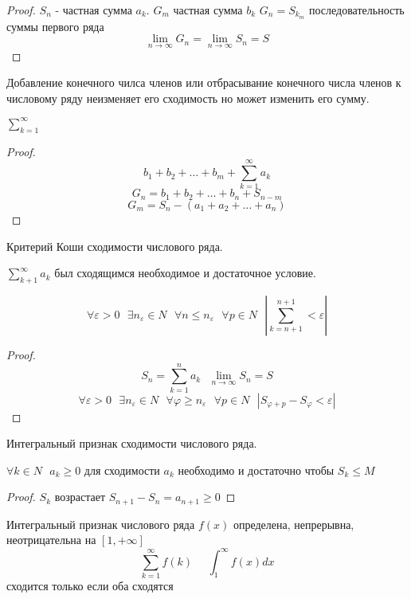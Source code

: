 \begin{proof}
  $S_n$ - частная сумма $a_k$. $G_m$ частная сумма $b_k$ $G_n = S_{k_m}$
  последовательность суммы первого ряда
  $$
  \lim_{n \to \infty} G_n = \lim_{n \to \infty} S_n = S
  $$
\end{proof}

  Добавление конечного чилса членов или отбрасывание конечного числа членов к
числовому ряду неизменяет его сходимость но может изменить его сумму.

\begin{theorem}
  $\sum_{k=1}^{\infty}$
\end{theorem}

\begin{proof}
  $$
  b_1 + b_2 + \ldots + b_m + \sum_{k=1}^{\infty} a_k
  $$
  $$
  G_n = b_1 + b_2 + \ldots + b_n + S_{n-m}
  $$
  $$
  G_m = S_n - (a_1 + a_2 + \ldots + a_n)
  $$
\end{proof}

\begin{title}[\Large]
  Критерий Коши сходимости числового ряда.
\end{title}

$\sum_{k+1}^{\infty} a_k$ был сходящимся необходимое и достаточное условие.

$$
\forall \varepsilon > 0 ~~~
\exists n_{\varepsilon} \in N ~~~
\forall n \le n_{\varepsilon} ~~~
\forall p \in N ~~~
\left| \sum_{k=n+1}^{n+1} < \varepsilon \right|
$$

\begin{proof}
  $$
  S_n = \sum_{k=1}^n a_k ~~~ \lim_{n \to \infty} S_n = S
  $$
  $$
  \forall \varepsilon > 0 ~~~
  \exists n_{\varepsilon} \in N ~~~
  \forall \varphi \ge n_{\varepsilon} ~~~
  \forall p \in N ~~~
  \left| S_{\varphi + p} - S_{\varphi} < \varepsilon \right|
  $$
\end{proof}

\begin{title}[\Large]
  Интегральный признак сходимости числового ряда.
\end{title}

$
\forall k \in N ~~~
a_k \ge 0
$
для сходимости $a_k$ необходимо и достаточно чтобы $S_k \le M$

\begin{proof}
  $S_k$ возрастает $S_{n+1} - S_n = a_{n+1} \ge 0$
\end{proof}

\begin{theorem}
  Интегральный признак числового ряда $f(x)$ определена, непрерывна,
  неотрицательна на $[1, +\infty]$
  $$
  \sum_{k=1}^{\infty} f(k) ~~~~~~ \int_1^{\infty} f(x)dx
  $$
  сходится только если оба сходятся
\end{theorem}

